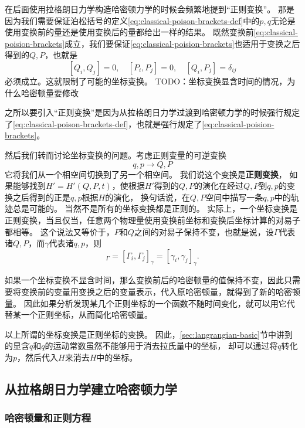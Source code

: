 \documentclass[UTF8, a4paper]{ctexart}
\begin{document}
在后面使用拉格朗日力学构造哈密顿力学的时候会频繁地提到“正则变换”。
那是因为我们需要保证泊松括号的定义\eqref{eq:classical-poison-brackets-def}中的$p,q$无论是使用变换前的量还是使用变换后的量都给出一样的结果。
既然变换前\eqref{eq:classical-poision-brackets}成立，我们要保证\eqref{eq:classical-poision-brackets}也适用于变换之后得到的$Q,P$，也就是
\[
    [Q_i, Q_j] = 0, \quad [P_i, P_j] = 0, \quad [Q_i, P_j] = \delta_{ij}
\]
必须成立。这就限制了可能的坐标变换。
TODO：坐标变换显含时间的情况，为什么哈密顿量要修改

之所以要引入“正则变换”是因为从拉格朗日力学过渡到哈密顿力学的时候强行规定了\eqref{eq:classical-poison-brackets-def}，也就是强行规定了\eqref{eq:classical-poision-brackets}。

然后我们转而讨论坐标变换的问题。考虑正则变量的可逆变换
\[
    q, p \longrightarrow Q, P
\]
它将我们从一个相空间切换到了另一个相空间。
我们说这个变换是\textbf{正则变换}，
如果能够找到$H'=H'(Q, P, t)$，使根据$H'$得到的$Q, P$的演化在经过$Q, P$到$q, p$的变换之后得到的正是$q, p$根据$H$的演化，
换句话说，在$Q,P$空间中描写一条$q,p$中的轨迹总是可能的。
当然不是所有的坐标变换都是正则的。
实际上，一个坐标变换是正则变换，当且仅当，任意两个物理量使用变换前坐标和变换后坐标计算的对易子都相等。
这个说法又等价于，$P$和$Q$之间的对易子保持不变，也就是说，设$\Gamma$代表诸$Q,P$，而$\gamma$代表诸$q,p$，则
\begin{equation}
    [\Gamma_i, \Gamma_j]_\Gamma = [\Gamma_i, \Gamma_j]_\gamma = [\gamma_i, \gamma_j]_\gamma. 
\end{equation}

如果一个坐标变换不显含时间，那么变换前后的哈密顿量的值保持不变，因此只需要将变换前的变量用变换之后的变量表示，代入原哈密顿量，就得到了新的哈密顿量。
因此如果分析发现某几个正则坐标的一个函数不随时间变化，就可以用它代替某一个正则坐标，从而简化哈密顿量。

以上所谓的坐标变换是正则坐标的变换。
因此，\ref{sec:langrangian-basic}节中讲到的显含$\dot{q}$和$q$的运动常数虽然不能够用于消去拉氏量中的坐标，
却可以通过将$\dot{q}$转化为$p$，然后代入$H$来消去$H$中的坐标。

\subsection{从拉格朗日力学建立哈密顿力学}
\label{sec:basic-hamilton-concepts-from-lagrange}

\subsubsection{哈密顿量和正则方程}\label{sec:hamiltionian-and-canonical}
\end{document}
